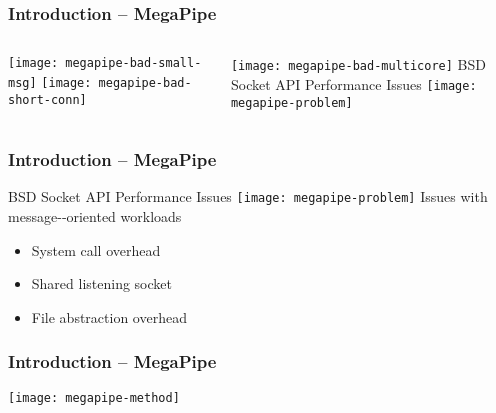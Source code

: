 \begin{frame}[plain]
	\frametitle{Introduction -- MegaPipe}
	
	
	\begin{columns}
		
		\begin{column}{.5\textwidth}	
			
			\texttt{[image: megapipe-bad-small-msg]}
			\texttt{[image: megapipe-bad-short-conn]}
		\end{column}
		
		\begin{column}{.5\textwidth}
			\texttt{[image: megapipe-bad-multicore]}
			BSD	Socket	 API	 Performance	 Issues
			\texttt{[image: megapipe-problem]}
			
			
		\end{column}
		
	\end{columns}
	
	
	
\end{frame}	


\begin{frame}[plain]
	\frametitle{Introduction -- MegaPipe}
			

			BSD	Socket	 API	 Performance	 Issues
\texttt{[image: megapipe-problem]}			
			Issues	with	 message-­‐oriented	 workloads
			\begin{itemize}
				\item  System	call	 overhead
				
				
				\item Shared	listening	 socket
				
				
				
				\item  File	abstraction	 overhead
				
			\end{itemize}
	
	
\end{frame}	



\begin{frame}[plain]
	\frametitle{Introduction -- MegaPipe}
	\centering
	\texttt{[image: megapipe-method]}			

	
	
\end{frame}	

